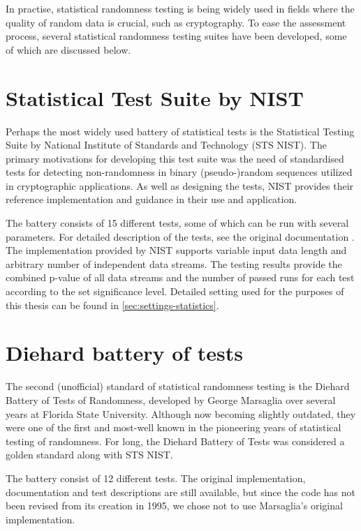 \documentclass[12pt,oneside]{fithesis2}
\begin{document}
\noindent
In practise, statistical randomness testing is being widely used in fields where the quality of random data is crucial, 
such as cryptography. To ease the assessment process, several statistical randomness testing suites have been developed, 
some of which are discussed below.

\section{Statistical Test Suite by NIST}
\label{sec:sts-nist}

Perhaps the most widely used battery of statistical tests is the Statistical Testing Suite 
by National Institute of Standards and Technology (STS NIST).
The primary motivations for developing this test suite was the need of standardised tests for detecting non-randomness 
in binary (pseudo-)random sequences utilized in cryptographic applications. As well as designing the tests,
NIST provides their reference implementation and guidance in their use and application. \parencite{sts-nist}

The battery consists of 15 different tests, some of which can be run with several parameters. 
For detailed description of the tests, see the original documentation \parencite{sts-nist-documentation}. 
The implementation provided by NIST supports variable input data length and arbitrary number of independent data streams. 
The testing results provide the combined p-value of all data streams and the number of passed runs for each test 
according to the set significance level. 
Detailed setting used for the purposes of this thesis can be found in \autoref{sec:settings-statistics}.

\section{Diehard battery of tests}
\label{sec:diehard}

The second (unofficial) standard of statistical randomness testing is the Diehard Battery of Tests of Randomness, 
developed by George Marsaglia over several years at Florida State University. \parencite{diehard} 
Although now becoming slightly outdated, they were one of the first and most-well known 
in the pioneering years of statistical testing of randomness. 
For long, the Diehard Battery of Tests was considered a golden standard along with STS NIST.

The battery consist of 12 different tests. The original implementation, documentation and test descriptions are still available,
but since the code has not been revised from its creation in 1995, we chose not to use Marsaglia's original implementation.
\end{document}
